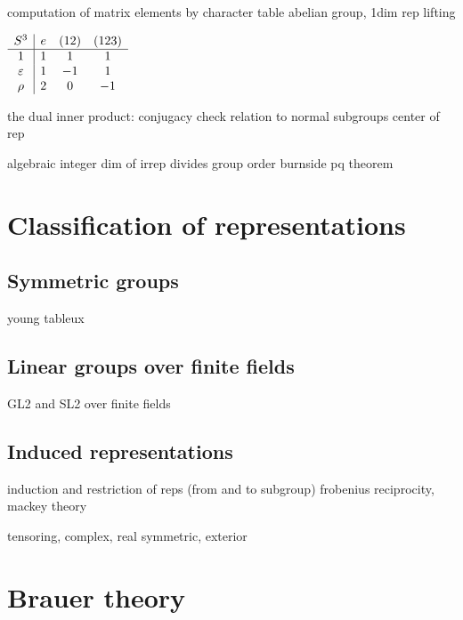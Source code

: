 \documentclass{../../large}
\begin{document}
\begin{prb}
computation of matrix elements by character table
abelian group, 1dim rep lifting
\begin{center}
$\begin{array}{c|ccc}
S^3&e&(12)&(123)\\\hline
1&1&1&1\\
\varepsilon&1&-1&1\\
\rho&2&0&-1
\end{array}$
\end{center}
\end{prb}






the dual inner product: conjugacy check
relation to normal subgroups
center of rep




algebraic integer
dim of irrep divides group order
burnside pq theorem





\chapter{Classification of representations}
\section{Symmetric groups}
young tableux

\section{Linear groups over finite fields}
GL2 and SL2 over finite fields

\section{Induced representations}
induction and restriction of reps (from and to subgroup)
frobenius reciprocity, mackey theory





tensoring, complex, real
symmetric, exterior


\chapter{Brauer theory}
\end{document}
